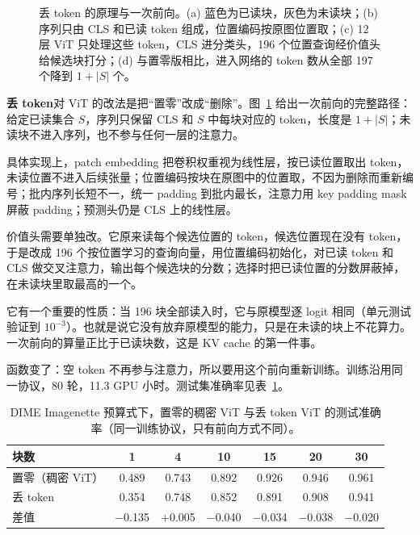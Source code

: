 \documentclass[11pt,a4paper,UTF8,fontset=none]{ctexart}
\newcommand{\term}[1]{\textbf{#1}}
\newcommand{\tokdrop}{丢 token}
\begin{document}
\begin{figure}[H]
\caption{\tokdrop{} 的原理与一次前向。(a) 蓝色为已读块，灰色为未读块；(b) 序列只由 CLS 和已读 token 组成，位置编码按原图位置取；(c) 12 层 ViT 只处理这些 token，CLS 进分类头，196 个位置查询经价值头给候选块打分；(d) 与置零版相比，进入网络的 token 数从全部 197 个降到 $1+|S|$ 个。}
\label{fig:tokdrop-arch}
\end{figure}

\term{\tokdrop}对 ViT 的改法是把“置零”改成“删除”。图~\ref{fig:tokdrop-arch} 给出一次前向的完整路径：给定已读集合 $S$，序列只保留 CLS 和 $S$ 中每块对应的 token，长度是 $1+|S|$；未读块不进入序列，也不参与任何一层的注意力。

具体实现上，patch embedding 把卷积权重视为线性层，按已读位置取出 token，未读位置不进入后续张量；位置编码按块在原图中的位置取，不因为删除而重新编号；批内序列长短不一，统一 padding 到批内最长，注意力用 key padding mask 屏蔽 padding；预测头仍是 CLS 上的线性层。

价值头需要单独改。它原来读每个候选位置的 token，候选位置现在没有 token，于是改成 196 个按位置学习的查询向量，用位置编码初始化，对已读 token 和 CLS 做交叉注意力，输出每个候选块的分数；选择时把已读位置的分数屏蔽掉，在未读块里取最高的一个。

它有一个重要的性质：当 196 块全部读入时，它与原模型逐 logit 相同（单元测试验证到 $10^{-3}$）。也就是说它没有放弃原模型的能力，只是在未读的块上不花算力。一次前向的算量正比于已读块数，这是 KV cache 的第一件事。

函数变了：空 token 不再参与注意力，所以要用这个前向重新训练。训练沿用同一协议，80 轮，11.3 GPU 小时。测试集准确率见表~\ref{tab:tokdrop}。

\begin{table}[H]
\centering
\caption{DIME Imagenette 预算式下，置零的稠密 ViT 与\tokdrop{} ViT 的测试准确率（同一训练协议，只有前向方式不同）。}
\label{tab:tokdrop}
\small
\begin{tabular}{lcccccc}
\toprule
块数 & 1 & 4 & 10 & 15 & 20 & 30 \\
\midrule
置零（稠密 ViT） & 0.489 & 0.743 & 0.892 & 0.926 & 0.946 & 0.961 \\
\tokdrop{} & 0.354 & 0.748 & 0.852 & 0.891 & 0.908 & 0.941 \\
差值 & $-$0.135 & +0.005 & $-$0.040 & $-$0.034 & $-$0.038 & $-$0.020 \\
\bottomrule
\end{tabular}
\end{table}
\end{document}
